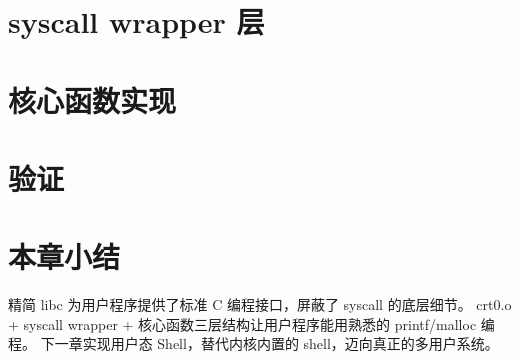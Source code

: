 
\section{syscall wrapper 层}
\label{sec:libc-syscall}


\section{核心函数实现}
\label{sec:libc-impl}


\section{验证}
\label{sec:libc-verify}


\section{本章小结}

精简 libc 为用户程序提供了标准 C 编程接口，屏蔽了 syscall 的底层细节。
crt0.o + syscall wrapper + 核心函数三层结构让用户程序能用熟悉的 printf/malloc 编程。
下一章实现用户态 Shell，替代内核内置的 shell，迈向真正的多用户系统。
